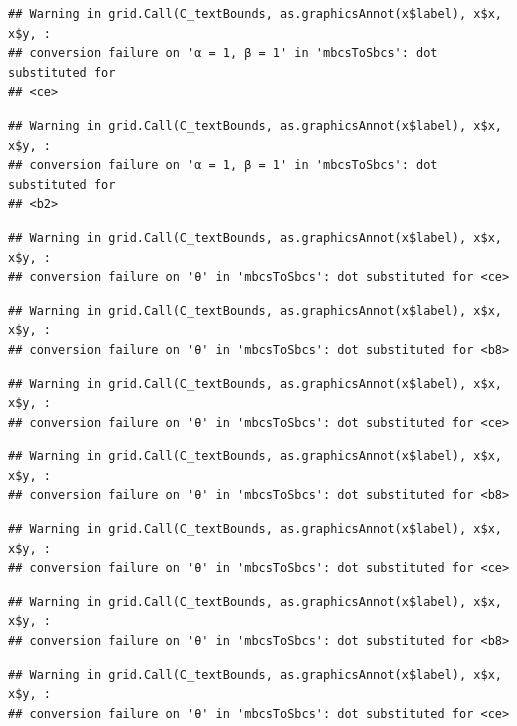 \documentclass[]{book}
\theoremstyle{definition}
\theoremstyle{definition}
\theoremstyle{definition}
\theoremstyle{remark}
\begin{document}
\begin{verbatim}
## Warning in grid.Call(C_textBounds, as.graphicsAnnot(x$label), x$x, x$y, :
## conversion failure on 'α = 1, β = 1' in 'mbcsToSbcs': dot substituted for
## <ce>
\end{verbatim}

\begin{verbatim}
## Warning in grid.Call(C_textBounds, as.graphicsAnnot(x$label), x$x, x$y, :
## conversion failure on 'α = 1, β = 1' in 'mbcsToSbcs': dot substituted for
## <b2>
\end{verbatim}

\begin{verbatim}
## Warning in grid.Call(C_textBounds, as.graphicsAnnot(x$label), x$x, x$y, :
## conversion failure on 'θ' in 'mbcsToSbcs': dot substituted for <ce>
\end{verbatim}

\begin{verbatim}
## Warning in grid.Call(C_textBounds, as.graphicsAnnot(x$label), x$x, x$y, :
## conversion failure on 'θ' in 'mbcsToSbcs': dot substituted for <b8>
\end{verbatim}

\begin{verbatim}
## Warning in grid.Call(C_textBounds, as.graphicsAnnot(x$label), x$x, x$y, :
## conversion failure on 'θ' in 'mbcsToSbcs': dot substituted for <ce>
\end{verbatim}

\begin{verbatim}
## Warning in grid.Call(C_textBounds, as.graphicsAnnot(x$label), x$x, x$y, :
## conversion failure on 'θ' in 'mbcsToSbcs': dot substituted for <b8>
\end{verbatim}

\begin{verbatim}
## Warning in grid.Call(C_textBounds, as.graphicsAnnot(x$label), x$x, x$y, :
## conversion failure on 'θ' in 'mbcsToSbcs': dot substituted for <ce>
\end{verbatim}

\begin{verbatim}
## Warning in grid.Call(C_textBounds, as.graphicsAnnot(x$label), x$x, x$y, :
## conversion failure on 'θ' in 'mbcsToSbcs': dot substituted for <b8>
\end{verbatim}

\begin{verbatim}
## Warning in grid.Call(C_textBounds, as.graphicsAnnot(x$label), x$x, x$y, :
## conversion failure on 'θ' in 'mbcsToSbcs': dot substituted for <ce>
\end{verbatim}
\end{document}
